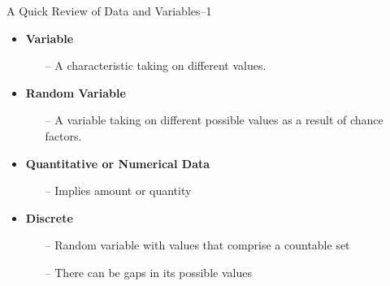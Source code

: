 
\begin{frame}[t]{A Quick Review of Data and Variables--1}
	\begin{itemize}
		\item \textbf{Variable}
		\begin{itemize}
			\item[--]  A characteristic taking on different values. 
		\end{itemize}
	\end{itemize}
	
	\begin{itemize}
		\item \textbf{Random Variable}
		\begin{itemize}
			\item[--] A variable taking on different possible values as a 
			result of chance factors. 
		\end{itemize}
	\end{itemize}

		\begin{itemize}
		\item \textbf{Quantitative or Numerical Data}
		\begin{itemize}
			\item[--] Implies amount or quantity
		\end{itemize}
	\end{itemize}
	
	\begin{itemize}
		\item \textbf{Discrete}
		\begin{itemize}
			\item[--] Random variable with values that comprise a countable
			set
			\item [--]  There can be gaps in its possible values
		\end{itemize}
	\end{itemize}	
\end{frame}
